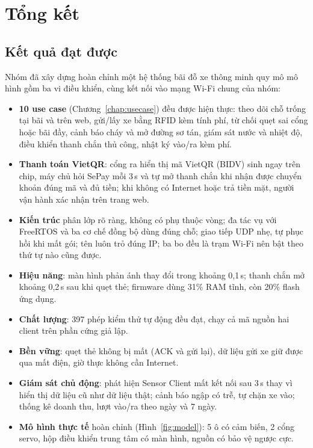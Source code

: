 \chapter{Tổng kết}\label{chap:ketluan}

\section{Kết quả đạt được}
Nhóm đã xây dựng hoàn chỉnh một hệ thống bãi đỗ xe thông minh quy mô mô hình gồm ba
vi điều khiển, cùng kết nối vào mạng Wi-Fi chung của nhóm:
\begin{itemize}
  \item \textbf{10 use case} (Chương~\ref{chap:usecase}) đều được hiện thực: theo dõi chỗ
        trống tại bãi và trên web, gửi/lấy xe bằng RFID kèm tính phí, từ chối quẹt sai
        cổng hoặc bãi đầy, cảnh báo cháy và mở đường sơ tán, giám sát nước và nhiệt độ,
        điều khiển thanh chắn thủ công, nhật ký vào/ra kèm phí.
  \item \textbf{Thanh toán VietQR}: cổng ra hiển thị mã VietQR (BIDV) sinh ngay trên chip,
        máy chủ hỏi SePay mỗi 3\,s và tự mở thanh chắn khi nhận được chuyển khoản đúng mã
        và đủ tiền; khi không có Internet hoặc trả tiền mặt, người vận hành xác nhận trên
        trang web.
  \item \textbf{Kiến trúc} phân lớp rõ ràng, không có phụ thuộc vòng; đa tác vụ với
        FreeRTOS và ba cơ chế đồng bộ dùng đúng chỗ; giao tiếp UDP nhẹ, tự phục hồi khi mất gói;
        tên  luôn trỏ đúng IP; ba bo đều là trạm Wi-Fi nên bật theo
        thứ tự nào cũng được.
  \item \textbf{Hiệu năng}: màn hình phản ánh thay đổi trong khoảng 0,1\,s; thanh chắn mở
        khoảng 0,2\,s sau khi quẹt thẻ; firmware dùng 31\% RAM tĩnh, còn 20\% flash ứng dụng.
  \item \textbf{Chất lượng}: 397 phép kiểm thử tự động đều đạt, chạy cả mã nguồn hai
        client trên phần cứng giả lập.
  \item \textbf{Bền vững}: quẹt thẻ không bị mất (ACK và gửi lại), dữ liệu gửi xe giữ được qua mất điện, giờ thực không cần Internet.
  \item \textbf{Giám sát chủ động}: phát hiện Sensor Client mất kết nối sau 3\,s thay vì
        hiển thị dữ liệu cũ như dữ liệu thật; cảnh báo ngập có trễ, tự chặn xe vào; thống kê
        doanh thu, lượt vào/ra theo ngày và 7 ngày.
  \item \textbf{Mô hình thực tế} hoàn chỉnh (Hình~\ref{fig:model}): 5 ô có cảm biến, 2 cổng
        servo, hộp điều khiển trung tâm có màn hình, nguồn có bảo vệ ngược cực.
\end{itemize}

